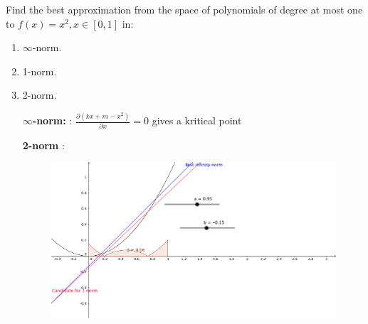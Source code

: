 \begin{problem}
Find the best approximation from the space of polynomials of degree at
most one to $f(x) = x^2 , x \in [0 , 1]$ in:
\begin{enumerate}
\item $\infty$-norm.
\item 1-norm.
\item 2-norm.
\end{enumerate}
\end{problem}

\begin{solution}
  \begin{enumerate}
  \item [{\bf $\infty$-norm: }]:
    $\frac{\partial (kx + m - x^2)}{\partial x} = 0$ gives a kritical
    point 

  \item [{\bf 2-norm}]:
    \begin{figure}[!ht]
      \centering
      \includegraphics[scale = 0.2]{task7.png}
      \label{fig:task_7}
    \end{figure}

  \end{enumerate}
\end{solution}

 	

